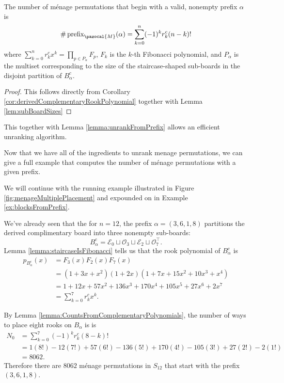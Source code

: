 \begin{theorem}
  The number of m\'enage permutations that begin with a valid, nonempty
  prefix $\alpha$ is
  \begin{equation}
    \#\operatorname{prefix}_\pazocal{M}(\alpha) = \sum_{k=0}^{n} (-1)^k r_k^c (n-k)!
  \end{equation} where
  $\sum_{k=0}^n r_k^c x^k = \prod_{p \in P_\alpha} F_p$,
  $F_k$ is the $k$-th Fibonacci polynomial, and
  $P_\alpha$ is the multiset corresponding to the size of the staircase-shaped
  sub-boards in the disjoint partition of $B_\alpha^c$.
\end{theorem}
\begin{proof}
  This follows directly from Corollary \ref{cor:derivedComplementaryRookPolynomial}
  together with Lemma \ref{lem:subBoardSizes}
\end{proof}

This together with Lemma \ref{lemma:unrankFromPrefix} allows an efficient
unranking algorithm.

Now that we have all of the ingredients to unrank menage permutations,
we can give a full example that computes the number of m\'enage
permutations with a given prefix.

\begin{example}
  We will continue with the running example illustrated in
  Figure \ref{fig:menageMultiplePlacement} and expounded on
  in Example \ref{ex:blocksFromPrefix}.

  We've already seen that the for $n = 12$, the prefix $\alpha = (3,6,1,8)$
  partitions the derived complimentary board into three nonempty sub-boards: \begin{equation}
    B_\alpha^c = \mathcal{E}_0 \sqcup \mathcal{O}_3 \sqcup \mathcal{E}_2 \sqcup \mathcal{O}_7^\intercal.
  \end{equation} Lemma \ref{lemma:staircaseIsFibonacci} tells us that the rook polynomial of
  $B_\alpha^c$ is \begin{align}
    p_{B_\alpha^c}(x)
    &= F_3(x)F_2(x)F_7(x) \\
    &= (1 + 3x + x^2)(1 + 2x)(1 + 7x + 15x^2 + 10x^3 + x^4) \\
    &= 1 + 12 x + 57 x^2 + 136 x^3 + 170 x^4 + 105 x^5 + 27 x^6 + 2 x^7 \\
    &= \sum_{k=0}^7 r_k^c x^k.
  \end{align}

  By Lemma \ref{lemma:CountsFromComplementaryPolynomials},
  the number of ways to place eight rooks on $B_\alpha$ is
  is \begin{align}
    N_0
      &= \sum_{k=0}^{7} (-1)^k r_k^c (8-k)! \\
      &= 1(8!) - 12(7!) + 57(6!) - 136(5!) + 170(4!) - 105(3!) + 27(2!) - 2(1!) \\
      &= 8062.
  \end{align}
  Therefore there are $8062$ m\'enage permutations in $S_{12}$ that start with
  the prefix $(3,6,1,8)$.
\end{example}

